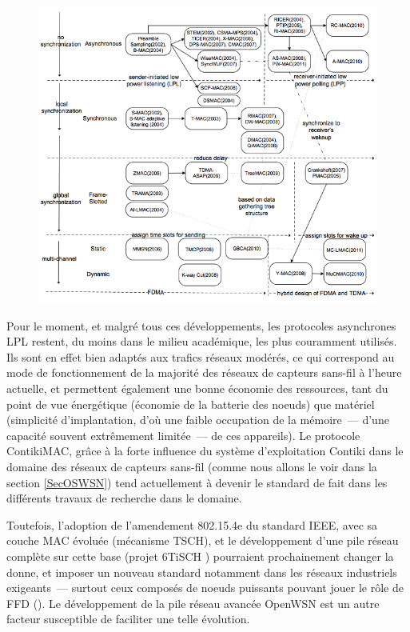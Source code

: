 \begin{figure}[!htb]
\centering
\includegraphics[width=12.5cm]{images/ch3-taxonomie-mac.png}
\label{FigTaxonomieMAC}
\end{figure}

Pour le moment, et malgré tous ces développements, les protocoles
asynchrones LPL restent, du moins dans le milieu académique, les plus
couramment utilisés. Ils sont en effet bien adaptés aux trafics réseaux
modérés, ce qui correspond au mode de fonctionnement de la majorité des
réseaux de capteurs sans-fil à l'heure actuelle, et permettent également
une bonne économie des ressources, tant du point de vue énergétique
(économie de la batterie des noeuds) que matériel (simplicité
d'implantation, d'où une faible occupation de la mémoire~--- d'une
capacité souvent extrêmement limitée~--- de ces appareils).
Le protocole ContikiMAC, grâce à la forte influence du système
d'exploitation Contiki dans le domaine des réseaux de capteurs
sans-fil (comme nous allons le voir dans la section \vref{SecOSWSN})
tend actuellement à devenir le standard de fait dans les différents
travaux de recherche dans le domaine.

Toutefois, l'adoption de l'amendement 802.15.4e du standard IEEE,
avec sa couche MAC évoluée (mécanisme TSCH), et le développement d'une
pile réseau complète sur cette base (projet 6TiSCH \cite{6TiSCH}
\cite{6TiSCHbis} \cite{6TiSCHter}) pourraient prochainement changer
la donne, et imposer un nouveau standard notamment dans les réseaux
industriels exigeants~--- surtout ceux composés de noeuds puissants
pouvant jouer le rôle de FFD ().
Le développement de la pile réseau avancée OpenWSN est un autre facteur
susceptible de faciliter une telle évolution.



